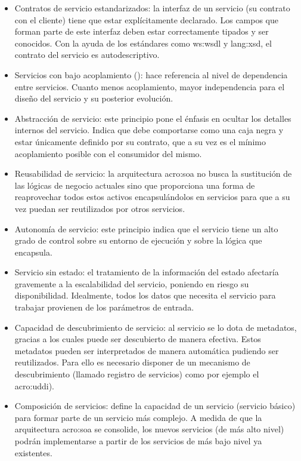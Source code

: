 \begin{itemize}
  \item Contratos de servicio estandarizados: la interfaz de un servicio (su contrato con el cliente) tiene que estar explícitamente declarado. Los campos  que forman parte de este interfaz deben estar correctamente tipados y ser conocidos. Con la ayuda de los estándares como \gls{ws:wsdl} y \gls{lang:xsd}, el contrato del servicio es autodescriptivo.

  \item Servicios con bajo acoplamiento (): hace referencia al nivel de dependencia entre servicios. Cuanto menos acoplamiento, mayor independencia para el diseño del servicio y su posterior evolución.

  \item Abstracción de servicio: este principio pone el énfasis en ocultar los detalles internos del servicio. Indica que debe comportarse como una caja negra y estar únicamente definido por su contrato, que a su vez es el mínimo acoplamiento posible con el consumidor del mismo.

  \item Reusabilidad de servicio: la arquitectura \gls{acro:soa} no busca la sustitución de las lógicas de negocio actuales sino que proporciona una forma de reaprovechar todos estos activos encapsulándolos en servicios para que a su vez puedan ser reutilizados por otros servicios.

  \item Autonomía de servicio: este principio indica que el servicio tiene un alto grado de control sobre su entorno de ejecución y sobre la lógica que encapsula.

  \item Servicio sin estado: el tratamiento de la información del estado afectaría gravemente a la escalabilidad del servicio, poniendo en riesgo su disponibilidad. Idealmente, todos los datos que necesita el servicio para trabajar provienen de los parámetros de entrada.

  \item Capacidad de descubrimiento de servicio: al servicio se lo dota de metadatos, gracias a los cuales puede ser descubierto de manera efectiva. Estos metadatos pueden ser interpretados de manera automática pudiendo ser reutilizados. Para ello es necesario disponer de un mecanismo de descubrimiento (llamado registro de servicios) como por ejemplo el \gls{acro:uddi}).

  \item Composición de servicios: define la capacidad de un servicio (servicio básico) para formar parte de un servicio más complejo. A medida de que la arquitectura \gls{acro:soa} se consolide, los nuevos servicios (de más alto nivel) podrán implementarse a partir de los servicios de más bajo nivel ya existentes.


\end{itemize}
